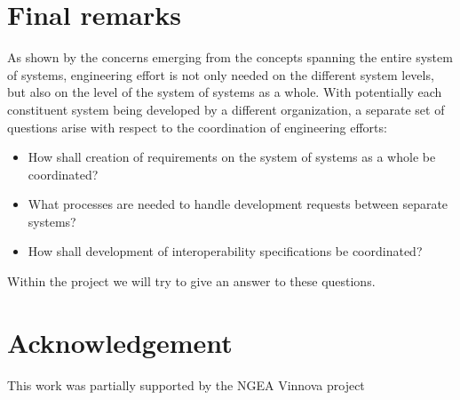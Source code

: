 \documentclass{llncs}
\begin{document}
\section*{Final remarks}
As shown by the concerns emerging from the concepts spanning the entire system of systems, engineering effort is not only needed on the different system levels, but also on the level of the system of systems as a whole. With potentially each constituent system being developed by a different organization, a separate set of questions arise with respect to the coordination of engineering efforts: 

\begin{itemize}
\item How shall creation of requirements on the system of systems as a whole be coordinated? 
\item What processes are needed to handle development requests between separate systems? 
\item How shall development of interoperability specifications be coordinated? 
\end{itemize}

Within the project we will try to give an answer to these questions.


\section*{Acknowledgement}
This work was partially supported by the NGEA Vinnova
project 


	

\clearpage
% 
\end{document}
